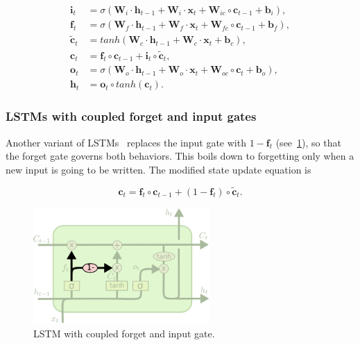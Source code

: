 \begin{equation}\label{eq:LSTM_peepholes}
\begin{split}
\mathbf{i}_t &= \sigma\left(\mathbf{W}_i \cdot \mathbf{h}_{t-1} +
\mathbf{W}_i \cdot \mathbf{x}_t +
\mathbf{W}_{ic} \circ \mathbf{c}_{t-1} +
\mathbf{b}_i \right),\\
\mathbf{f}_t &= \sigma\left(\mathbf{W}_f \cdot \mathbf{h}_{t-1} +
\mathbf{W}_f \cdot \mathbf{x}_t +
\mathbf{W}_{fc} \circ \mathbf{c}_{t-1} +
\mathbf{b}_f \right),\\
\mathbf{\tilde c}_t &= tanh \left(\mathbf{W}_c \cdot \mathbf{h}_{t-1} +
\mathbf{W}_c \cdot \mathbf{x}_t + \mathbf{b}_c \right),\\
\mathbf{c}_t &= \mathbf{f}_t \circ \mathbf{c}_{t-1} + \mathbf{i}_t
\circ \mathbf{\tilde c}_t,\\
\mathbf{o}_t &= \sigma\left(\mathbf{W}_o \cdot \mathbf{h}_{t-1} +
\mathbf{W}_o \cdot \mathbf{x}_t +
\mathbf{W}_{oc} \circ \mathbf{c}_{t} +
\mathbf{b}_o \right),\\
\mathbf{h}_t &= \mathbf{o}_t \circ tanh \left(\mathbf{c}_t\right).
\end{split}
\end{equation}


\subsubsection{LSTMs with coupled forget and input gates}\label{sec:LSTM_coupled}

Another variant of LSTMs~\cite{Greff_15} replaces the input gate with $1 - \mathbf{f}_t$ (see~\ref{fig:LSTM_coupled}), so that the forget gate governs both behaviors. This boils down to forgetting only when a new input is going to be written. The modified state update equation is

\begin{equation}\label{eq:LSTM_coupled}
\mathbf{c}_t = \mathbf{f}_t \circ \mathbf{c}_{t-1} + (1 - \mathbf{f}_t)
\circ \mathbf{\tilde c}_t.
\end{equation}

\begin{figure}
	\centering
	\includegraphics[width=0.6\textwidth]{figures/LSTM_coupled.pdf}
	\caption{LSTM with coupled forget and input gate.\label{fig:LSTM_coupled}}
\end{figure}


